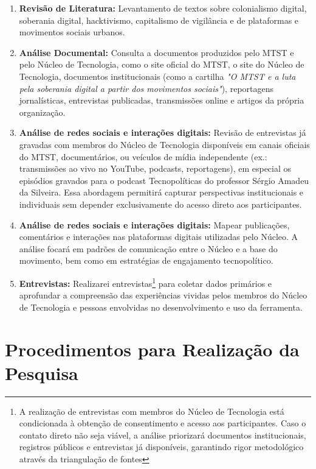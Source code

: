 \begin{enumerate}

    \item \textbf{Revisão de Literatura:} Levantamento de textos sobre colonialismo digital, soberania digital, hacktivismo, capitalismo de vigilância e de plataformas e movimentos sociais urbanos.

    \item \textbf{Análise Documental:} Consulta a documentos produzidos pelo MTST e pelo Núcleo de Tecnologia, como o site oficial do MTST, o site do Núcleo de Tecnologia, documentos institucionais (como a cartilha \textit{"O MTST e a luta pela soberania digital a partir dos movimentos sociais"}), reportagens jornalísticas, entrevistas publicadas, transmissões online e artigos da própria organização. 

    \item \textbf{Análise de redes sociais e interações digitais:} Revisão de entrevistas já gravadas com membros do Núcleo de Tecnologia disponíveis em canais oficiais do MTST, documentários, ou veículos de mídia independente (ex.: transmissões ao vivo no YouTube, podcasts, reportagens), em especial os episódios gravados para o podcast Tecnopolíticas do professor Sérgio Amadeu da Silveira. Essa abordagem permitirá capturar perspectivas institucionais e individuais sem depender exclusivamente do acesso direto aos participantes.

    \item \textbf{Análise de redes sociais e interações digitais:} Mapear publicações, comentários e interações nas plataformas digitais utilizadas pelo Núcleo. A análise focará em padrões de comunicação entre o Núcleo e a base do movimento, bem como em estratégias de engajamento tecnopolítico.
    
    \item \textbf{Entrevistas:} Realizarei entrevistas\footnote{A realização de entrevistas com membros do Núcleo de Tecnologia está condicionada à obtenção de consentimento e acesso aos participantes. Caso o contato direto não seja viável, a análise priorizará documentos institucionais, registros públicos e entrevistas já disponíveis, garantindo rigor metodológico através da triangulação de fontes} para coletar dados primários e aprofundar a compreensão das experiências vividas pelos membros do Núcleo de Tecnologia e pessoas envolvidas no desenvolvimento e uso da ferramenta. 
\end{enumerate}

\section{Procedimentos para Realização da Pesquisa}

